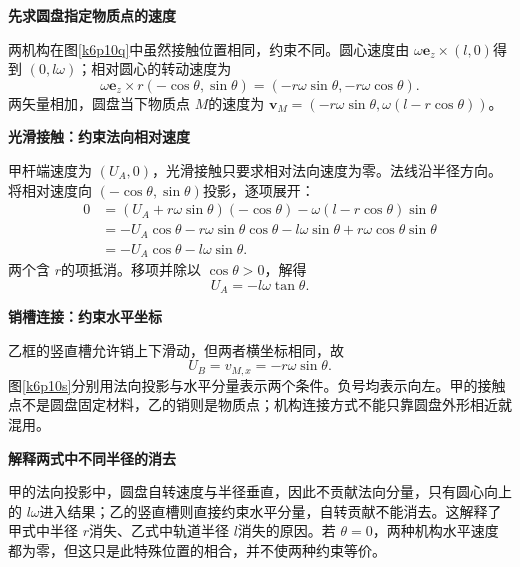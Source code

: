 \begin{solution}\textbf{先求圆盘指定物质点的速度}\par\nobreak
两机构在图\ref{k6p10q}中虽然接触位置相同，约束不同。圆心速度由 $\omega\bm e_z\times(l,0)$得到 $(0,l\omega)$；相对圆心的转动速度为
\[
 \omega\bm e_z\times r(-\cos\theta,\sin\theta)
 =(-r\omega\sin\theta,-r\omega\cos\theta).
\]
两矢量相加，圆盘当下物质点 $M$的速度为 $\bm v_M=(-r\omega\sin\theta,\omega(l-r\cos\theta))$。



\par\medskip{}\noindent\textbf{光滑接触：约束法向相对速度}\par\nobreak
甲杆端速度为 $(U_A,0)$，光滑接触只要求相对法向速度为零。法线沿半径方向。将相对速度向 $(-\cos\theta,\sin\theta)$投影，逐项展开：
\begin{align*}
 0&=(U_A+r\omega\sin\theta)(-\cos\theta)
 -\omega(l-r\cos\theta)\sin\theta\\
 &=-U_A\cos\theta-r\omega\sin\theta\cos\theta
 -l\omega\sin\theta+r\omega\cos\theta\sin\theta\\
 &=-U_A\cos\theta-l\omega\sin\theta.
\end{align*}
两个含 $r$的项抵消。移项并除以 $\cos\theta>0$，解得 \[\boxed{U_A=-l\omega\tan\theta}.\]



\par\medskip{}\noindent\textbf{销槽连接：约束水平坐标}\par\nobreak
乙框的竖直槽允许销上下滑动，但两者横坐标相同，故 \[\boxed{U_B=v_{M,x}=-r\omega\sin\theta}.\]图\ref{k6p10s}分别用法向投影与水平分量表示两个条件。负号均表示向左。甲的接触点不是圆盘固定材料，乙的销则是物质点；机构连接方式不能只靠圆盘外形相近就混用。



\par\medskip{}\noindent\textbf{解释两式中不同半径的消去}\par\nobreak
甲的法向投影中，圆盘自转速度与半径垂直，因此不贡献法向分量，只有圆心向上的 $l\omega$进入结果；乙的竖直槽则直接约束水平分量，自转贡献不能消去。这解释了甲式中半径 $r$消失、乙式中轨道半径 $l$消失的原因。若 $\theta=0$，两种机构水平速度都为零，但这只是此特殊位置的相合，并不使两种约束等价。\end{solution}

